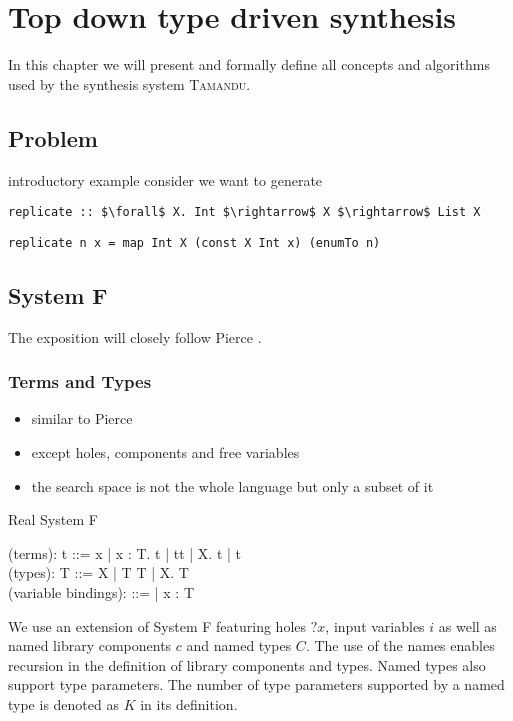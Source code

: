 \chapter{Top down type driven synthesis} \label{definitions}

In this chapter we will present and formally define all concepts and algorithms used by the synthesis system \textsc{Tamandu}.


\section{Problem}
introductory example
consider we want to generate 
\begin{lstlisting}[style=plain, mathescape]
replicate :: $\forall$ X. Int $\rightarrow$ X $\rightarrow$ List X
\end{lstlisting}

\begin{lstlisting}[style=plain, mathescape]
replicate n x = map Int X (const X Int x) (enumTo n)
\end{lstlisting}

\section{System F}
The exposition will closely follow  Pierce .

  \subsection{Terms and Types}
\begin{itemize}
\item similar to Pierce
\item except holes, components and free variables
\item the search space is not the whole language but only a subset of it
\end{itemize}

Real System F
 \begin{plstx}
(terms): t ::= x | \lambda x : T. t | t\;t | \Lambda X. t | t\;[T]\\
(types): T ::= X | T \rightarrow T | \forall X. T\\
(variable bindings): \Gamma ::= \emptyset | \Gamma \cup x : T\\
\end{plstx}

We use an extension of System F featuring holes $?x$, input variables $i$ as well as named library components $c$ and named types $C$. The use of the names enables recursion in the definition of library components and types. Named types also support type parameters. The number of type parameters supported by a named type is denoted as $K$ in its definition.

